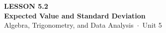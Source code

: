 \documentclass[aspectratio=169, 11pt]{beamer}
\begin{document}
{
\begin{frame}[plain]
  \vspace{2.8cm}\hspace{0.55cm}%
  \begin{minipage}{0.9\textwidth}
    {\color{goldacc}\bfseries\small LESSON 5.2}\\[0.5cm]
    {\color{white}\bfseries\LARGE Expected Value and Standard Deviation}\\[1.2cm]
    {\color{mistmid}\small Algebra, Trigonometry, and Data Analysis~$\cdot$~Unit 5}
  \end{minipage}
\end{frame}
}

\begin{frame}[t, plain]
\end{frame}
\end{document}
